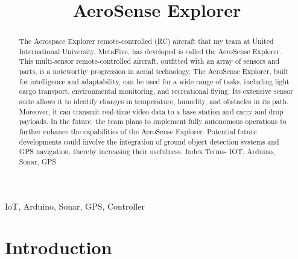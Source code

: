 \documentclass[conference]{IEEEtran}
\begin{document}
\title{AeroSense Explorer }

\author{
}

\maketitle

\begin{abstract}

The Aerospace Explorer remote-controlled (RC) aircraft that my team at United International University, MetaFive, has developed is called the AeroSense Explorer. This multi-sensor remote-controlled aircraft, outfitted with an array of sensors and parts, is a noteworthy progression in aerial technology. The AeroSense Explorer, built for intelligence and adaptability, can be used for a wide range of tasks, including light cargo transport, environmental monitoring, and recreational flying. Its extensive sensor suite allows it to identify changes in temperature, humidity, and obstacles in its path. Moreover, it can transmit real-time video data to a base station and carry and drop payloads. In the future, the team plans to implement fully autonomous operations to further enhance the capabilities of the AeroSense Explorer. Potential future developments could involve the integration of ground object detection systems and GPS navigation, thereby increasing their usefulness.
  Index Terms- IOT, Arduino, Sonar, GPS
\end{abstract}

\begin{IEEEkeywords}
IoT, Arduino, Sonar, GPS, Controller
\end{IEEEkeywords}


\section{Introduction}
\end{document}
